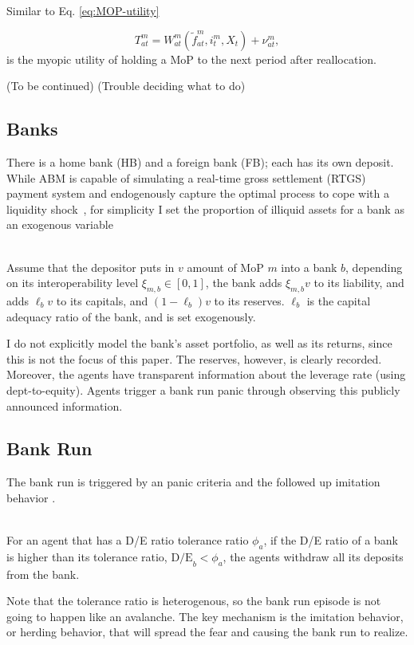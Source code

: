 Similar to Eq. \ref{eq:MOP-utility}

\begin{equation}
   \label{eq:POR-utility}
   T^m_{at} = W^m_{at}(\tilde{f}^m_{at}, i^m_t, X_t) + \nu^m_{at} ,
\end{equation}
is the myopic utility of holding a MoP to the next period after reallocation.

\begin{center}
   (To be continued)
   (Trouble deciding what to do)
\end{center}

\subsection{Banks}

There is a home bank (HB) and a foreign bank (FB); each has its own deposit.
While ABM is capable of simulating a real-time gross settlement (RTGS) payment
system and endogenously capture the optimal process to cope with a liquidity
shock~\citep*{GS08-ABM-Payment}, for simplicity I set the proportion of illiquid
assets for a bank as an exogenous variable

\begin{definition}
   \phantom{}\\
   Assume that the depositor puts in $v$ amount of MoP $m$ into a bank $b$,
   depending on its interoperability level $\xi_{m, b}\in [0,1]$, the bank adds
   $\xi_{m,b}v$ to its liability, and adds $\ell_b v$ to its capitals, and
   $(1-\ell_b) v$ to its reserves. $\ell_b$ is the capital adequacy ratio of the
   bank, and is set exogenously.
\end{definition}

I do not explicitly model the bank's asset portfolio, as well as its returns, since this is not the focus of this paper. The reserves, however, is clearly recorded. Moreover, the agents have transparent information about the leverage rate (using dept-to-equity). Agents trigger a bank run panic through observing this publicly announced information.

\subsection{Bank Run}

The bank run is triggered by an panic criteria and the followed up imitation behavior \citep*{Santos2021}.

\begin{definition}
   \phantom{}\\
   For an agent that has a D/E ratio tolerance ratio $\phi_a$, if the D/E ratio of a bank is higher than its tolerance ratio, $\mathrm{D/E}_b < \phi_a$, the agents withdraw all its deposits from the bank.
\end{definition}
Note that the tolerance ratio is heterogenous, so the bank run episode is not going to happen like an avalanche. The key mechanism is the imitation behavior, or herding behavior, that will spread the fear and causing the bank run to realize.

